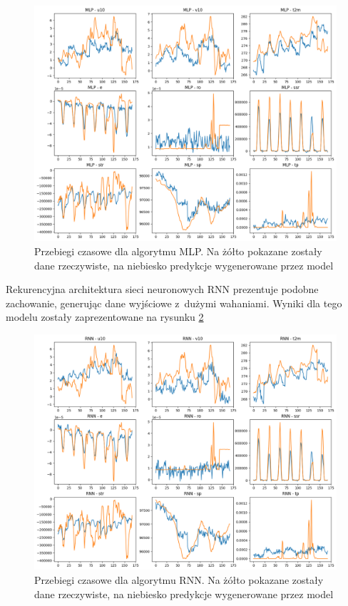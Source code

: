 \begin{figure}[H]
    \centering
    \includegraphics[width=\textwidth]{images/MLP_week.png}
    \caption[Przebiegi czasowe dla MLP]{Przebiegi czasowe dla algorytmu MLP. Na żółto pokazane zostały dane 
    rzeczywiste, na niebiesko predykcje wygenerowane przez model}
    \label{mlp-week}
\end{figure}

Rekurencyjna architektura sieci neuronowych RNN prezentuje podobne zachowanie, 
generując dane wyjściowe z~dużymi wahaniami. Wyniki dla tego modelu zostały zaprezentowane na rysunku \ref{rnn-week}

\begin{figure}[H]
    \centering
    \includegraphics[width=\textwidth]{images/rnn_week.png}
    \caption[Przebiegi czasowe dla RNN]{Przebiegi czasowe dla algorytmu RNN. Na żółto pokazane zostały dane 
    rzeczywiste, na niebiesko predykcje wygenerowane przez model}
    \label{rnn-week}
\end{figure}

